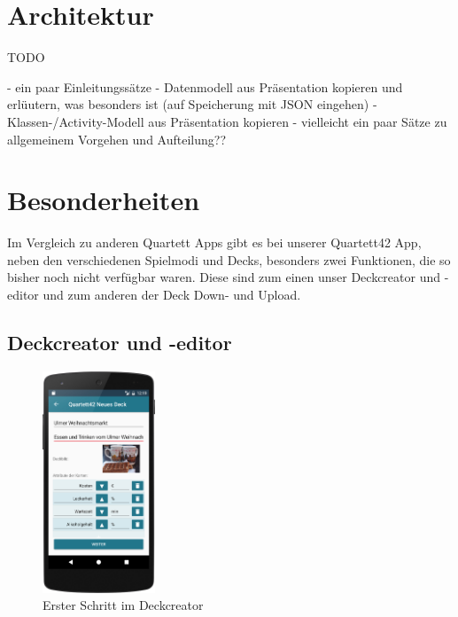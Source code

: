 \section{Architektur}
\label{sec:implementierung:architektur}

TODO

- ein paar Einleitungssätze
- Datenmodell aus Präsentation kopieren und erlüutern, was besonders ist (auf Speicherung mit JSON eingehen)
- Klassen-/Activity-Modell aus Präsentation kopieren
- vielleicht ein paar Sätze zu allgemeinem Vorgehen und Aufteilung??

\section{Besonderheiten}
\label{sec:implementierung:besonderheiten }

Im Vergleich zu anderen Quartett Apps gibt es bei unserer Quartett42 App, neben den verschiedenen Spielmodi und Decks, besonders zwei Funktionen, die so bisher noch nicht verfügbar waren. Diese sind zum einen unser Deckcreator und -editor und zum anderen der Deck Down- und Upload.	

\subsection{Deckcreator und -editor}
\label{sec:implementierung:besonderheiten:deckcreator }

\begin{figure}[htp]
	\centering
  	\includegraphics[width=0.3\textwidth]{img/screenshots/device_new_deck.png}
	\caption{Erster Schritt im Deckcreator}
	\label{figure:implementierungdeckcreator}
\end{figure}

